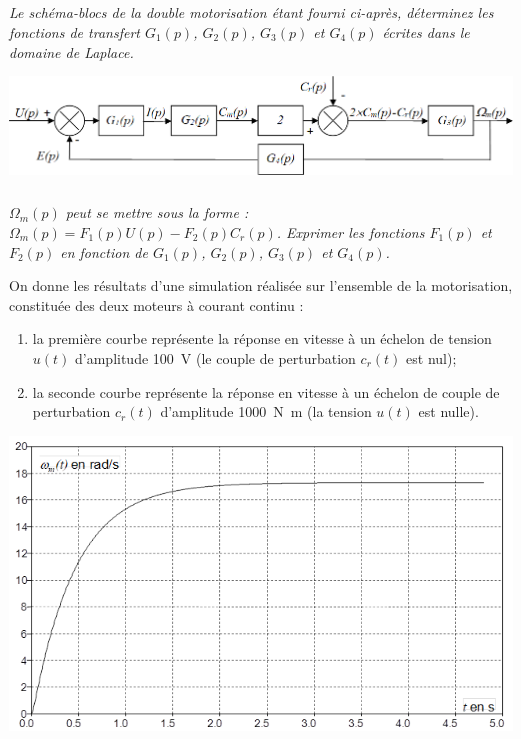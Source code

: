 \documentclass[10pt,fleqn]{article} %
\begin{document}
\begin{multicols}{2}
\subparagraph{}
\textit{Le schéma-blocs de la double motorisation étant fourni ci-après, déterminez les fonctions de transfert $G_1(p)$, $G_2(p)$, $G_3(p)$ et $G_4(p)$ écrites dans le domaine de Laplace.}

\begin{center}
	\includegraphics[width=\linewidth]{images2/fig_02}
\end{center}

\subparagraph{}
\textit{$\Omega_m(p)$ peut se mettre sous la forme :  $\Omega_m(p)=F_1(p)U(p)-F_2(p)C_r(p)$. Exprimer les fonctions $F_1(p)$ et $F_2(p)$ en fonction de $G_1(p)$, $G_2(p)$, $G_3(p)$ et $G_4(p)$.}


On donne les résultats d’une simulation réalisée sur l’ensemble de la motorisation, constituée des deux moteurs à courant continu :
\begin{enumerate}
\item la première courbe représente la réponse en vitesse à un échelon de tension $u(t)$ d’amplitude \SI{100}{V} (le couple de perturbation $c_r(t)$ est nul);
\item la seconde courbe représente la réponse en vitesse à un échelon de couple de perturbation $c_r(t)$ d’amplitude \SI{1000}{N.m} (la tension $u(t)$ est nulle).
\end{enumerate}



\begin{center}
\includegraphics[width=\linewidth]{images2/fig_06_a}


\end{center}
\end{multicols}
\end{document}
